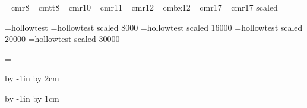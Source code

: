 
\hsize=297mm
\vsize=420mm






\font\small=cmr8
\font\smalltt=cmtt8
\font\medium=cmr10
\font\largemed=cmr11
\font\large=cmr12
\font\largebx=cmbx12
\font\Large=cmr17
\font\huge=cmr17 scaled 

\font\hollowtest=hollowtest
\font\hollowtestlarge=hollowtest scaled 8000
\font\hollowtestLarge=hollowtest scaled 16000
\font\hollowtestLARGE=hollowtest scaled 20000
\font\hollowtesthuge=hollowtest scaled  30000

\headline={\hfil}

\advance\voffset by -1in
\advance\voffset by 2cm

\advance\hoffset by -1in
\advance\hoffset by 1cm

\parindent=0pt
\parskip=0pt

\def\epsfsize#1#2{#1}

\nopagenumbers



\vbox{}
\vskip4cm
\vskip4cm
\vfil\eject

\vbox{}
\vskip-1cm
\vskip4cm



\bye



